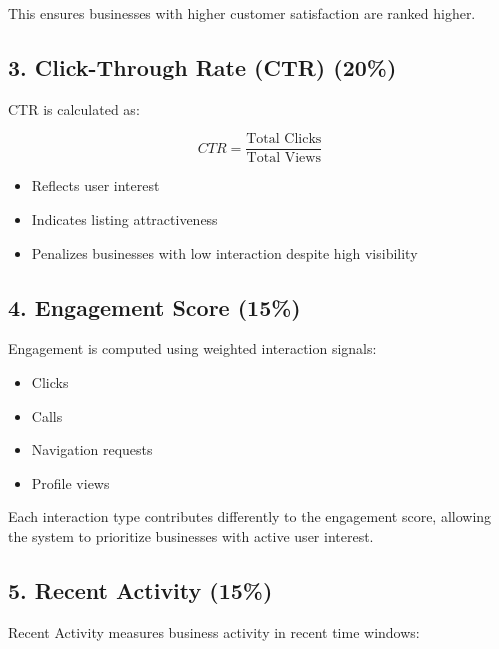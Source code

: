 \documentclass[12pt,a4paper]{report}
\begin{document}
This ensures businesses with higher customer satisfaction are ranked higher.

\subsection{3. Click-Through Rate (CTR) (20\%)}

CTR is calculated as:

\[

CTR = \frac{\text{Total Clicks}}{\text{Total Views}}

\]

\begin{itemize}

\item Reflects user interest

\item Indicates listing attractiveness

\item Penalizes businesses with low interaction despite high visibility

\end{itemize}

\subsection{4. Engagement Score (15\%)}

Engagement is computed using weighted interaction signals:

\begin{itemize}

\item Clicks

\item Calls

\item Navigation requests

\item Profile views

\end{itemize}

Each interaction type contributes differently to the engagement score, allowing the system to prioritize businesses with active user interest.

\subsection{5. Recent Activity (15\%)}

Recent Activity measures business activity in recent time windows:
\end{document}
